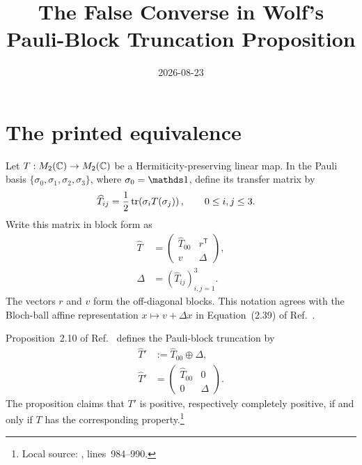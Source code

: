 \documentclass{article}
\title{The False Converse in Wolf's Pauli-Block Truncation Proposition}
\author{}
\date{2026-08-23}
\begin{document}
\maketitle
{}

\section{The printed equivalence}

Let $T:M_{2}(\mathbb{C})\to M_{2}(\mathbb{C})$ be a Hermiticity-preserving linear map. In the Pauli
basis $\{\sigma_0,\sigma_1,\sigma_2,\sigma_3\}$, where $\sigma_0=\Id$, define
its transfer matrix by
\begin{align}
    \widehat T_{ij}
        &=\frac{1}{2}\operatorname{tr}\!\left(\sigma_iT(\sigma_j)\right),
        \qquad 0\leq i,j\leq3.
    \label{eq:wolf_prop2_10_block_truncation_converse_transfer_entries}
\end{align}
Write this matrix in block form as
\begin{align}
    \widehat T
        &=
        \begin{pmatrix}
            \widehat T_{00} & r^{\mathsf T}\\
            v & \Delta
        \end{pmatrix},
    \label{eq:wolf_prop2_10_block_truncation_converse_transfer_blocks}\\
    \Delta
        &=(\widehat T_{ij})_{i,j=1}^{3}.
    \label{eq:wolf_prop2_10_block_truncation_converse_lower_block}
\end{align}
The vectors $r$ and $v$ form the off-diagonal blocks. This notation agrees
with the Bloch-ball affine representation $x\mapsto v+\Delta x$ in
Equation~(2.39) of Ref.~\cite{Wolf2012Quantum}.

Proposition~2.10 of Ref.~\cite{Wolf2012Quantum} defines the Pauli-block
truncation by
\begin{align}
    \widehat T'
        &:=\widehat T_{00}\oplus\Delta,
    \label{eq:wolf_prop2_10_block_truncation_converse_truncated_direct_sum}\\
    \widehat T'
        &=
        \begin{pmatrix}
            \widehat T_{00} & 0\\
            0 & \Delta
        \end{pmatrix}.
    \label{eq:wolf_prop2_10_block_truncation_converse_truncated_matrix}
\end{align}
The proposition claims that $T'$ is positive, respectively completely
positive, if and only if $T$ has the corresponding property.\footnote{Local
source: ,
lines~984--990.}
\end{document}
